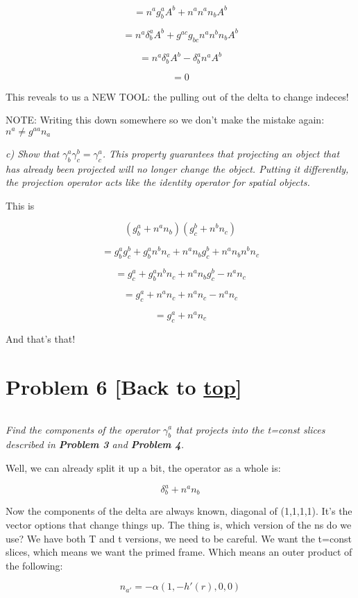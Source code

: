\documentclass[landscape,letterpaper,10pt,english]{article}
\begin{document}
\[ = n^ag^a_bA^b + n^an^an_bA^b \]

\[ = n^a\delta^a_bA^b + g^{ac}g_{bc}n^an^bn_bA^b \]

\[ = n^a\delta^a_bA^b - \delta^a_bn^aA^b \]

\[ = 0 \]

This reveals to us a NEW TOOL: the pulling out of the delta to change
indeces!

NOTE: Writing this down somewhere so we don't make the mistake again:
\(n^a \neq g^{aa}n_a\)

    \emph{c) Show that \(\gamma^a_b\gamma^b_c=\gamma^a_c\). This property
guarantees that projecting an object that has already been projected
will no longer change the object. Putting it differently, the projection
operator acts like the identity operator for spatial objects.}

This is

\[ (g^a_b + n^an_b)(g^b_c + n^bn_c) \]

\[ = g^a_bg^b_c +g^a_bn^bn_c + n^an_bg^b_c + n^an_bn^bn_c \]

\[ = g^a_c + g^a_bn^bn_c + n^an_bg^b_c - n^an_c \]

\[ = g^a_c + n^an_c + n^an_c - n^an_c \]

\[ = g^a_c + n^an_c \]

And that's that!

    \hypertarget{problem-6-back-to-top}{%
\section{\texorpdfstring{Problem 6 {[}Back to
\hyperref[toc]{top}{]}}{Problem 6 {[}Back to {]}}}\label{problem-6-back-to-top}}

\[\label{P6}\]

\emph{Find the components of the operator \(\gamma^a_b\) that projects
into the t=const slices described in \textbf{Problem 3} and
\textbf{Problem 4}.}

Well, we can already split it up a bit, the operator as a whole is:

\[ \delta^a_b + n^an_b \]

Now the components of the delta are always known, diagonal of (1,1,1,1).
It's the vector options that change things up. The thing is, which
version of the ns do we use? We have both T and t versions, we need to
be careful. We want the t=const slices, which means we want the primed
frame. Which means an outer product of the following:

\[ n_{a'} = -\alpha(1,-h'(r),0,0)\]
\end{document}
